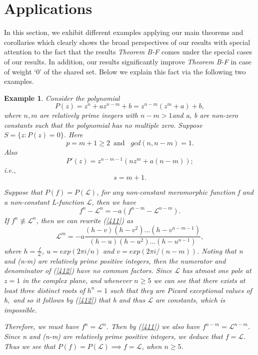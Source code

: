\documentclass[a4paper,draft]{amsproc}
\theoremstyle{plain}
\newtheorem{exm}{Example}[section]
\theoremstyle{definition}
\theoremstyle{remark}
\newcommand{\be}{\begin{equation}}
\newcommand{\ee}{\end{equation}}
\numberwithin{equation}{section}
\begin{document}
\section{Applications}
In this section, we exhibit different examples applying our main theorems and corollaries which clearly shows the broad perspectives of our results with special attention to the fact that the results  {\em Theorem B-F} comes under the special cases of our results. In addition, our results significantly improve {\em Theorem B-F} in case of weight `$0$' of the shared set. Below we explain this fact via the following two examples.
\begin{exm}\label{ex2}
	Consider the polynomial 
	\be\nonumber
	P(z)=z^n+az^{n-m}+b= z^{n-m}(z^{m}+a)+b,
	\ee
	where $n, m$  are relatively prime inegers with $n-m>1$and a, b are non-zero constants such that the polynomial has no multiple zero. Suppose $S=\{z:P(z)=0\}$.
	Here $$p=m+1\geq 2 \;\ \text{and }\;\ gcd(n,n-m)=1.$$Also \be\nonumber
	P'(z)=z^{n-m-1}(nz^{m}+a(n-m));
	\ee
	i.e., $$s=m+1.$$
	
	
	Suppose that $P(f)=P(\mathcal{L})$, for any non-constant meromorphic function f and a non-constant L-function $\mathcal{L}$,  then we have
	\be\label{411}
	f^n-\mathcal{L}^n=-a(f^{n-m}-\mathcal{L}^{n-m}).
	\ee
	If $f^n \not\equiv \mathcal{L}^n$, then we can rewrite (\ref{411}) as
	\be\label{412}
	\mathcal{L}^{m}=-a\frac{(h-v)(h-v^2)...(h-v^{{n-m}-1})}{(h-u)(h-u^2)...(h-u^{n-1})},
	\ee
	where $h =\displaystyle\frac{f}{\mathcal{L}}$, $u = exp(2\pi i/n)$ and $v = exp(2\pi i/(n-m))$. Noting that n and (n-m) are relatively prime positive
	integers, then the numerator and denominator of (\ref{412}) have no common factors. Since $\mathcal{L}$ has atmost one pole at $z = 1$ in
	the complex plane, and whenever $n\geq 5$ we can see that there exists at least three distinct roots of $h^n = 1$ such that they are Picard
	exceptional values of h$,$ and so it follows by (\ref{412}) that h and thus $\mathcal{L}$ are constants, which is impossible.
	
	Therefore, we must have $f^n = \mathcal{L}^n$. Then by (\ref{411}) we also have $f^{n-m} = \mathcal{L}^{n-m}$. Since n and (n-m) are relatively prime positive integers, we deduce that $f = \mathcal{L}$. Thus we see that $P(f)=P(\mathcal{L})\implies f=\mathcal{L}$, when $n\geq 5$. 
	

\end{exm}
\end{document}
